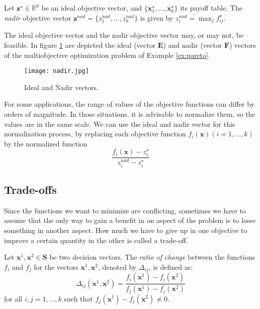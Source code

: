 {\begin{definition}
Let $\mathbf{z}^\star \in \mathbb{R}^k$ be an ideal objective vector, and $\{ \mathbf{x}^\star_1, \ldots, \mathbf{x}^\star_k \}$ its payoff table. The \emph{nadir} objective vector $\mathbf{z}^{nad} = \{ z^{nad}_1, \ldots, z^{nad}_k \}$ is given by $z^{nad}_i = \max_j f^\star_{ij}$.
\end{definition}

The ideal objective vector and the nadir objective vector may, or may not, be feasible. In figure \ref{fig:nadir} are depicted the ideal (vector $\mathbf{E}$) and nadir (vector $\mathbf{F}$) vectors of the multiobjective optimization problem of Example \ref{ex:pareto}.

\begin{figure}[h]
\centering\texttt{[image: nadir.jpg]}
\caption{\label{fig:nadir}Ideal and Nadir vectors.}
\end{figure}

For some applications, the range of values of the objective functions can differ by orders of magnitude. In those situations, it is advisable to normalize them, so the values are in the same scale. We can use the ideal and nadir vector for this normalization process, by replacing each objective function $f_i (\mathbf{x}) (i = 1, \ldots, k)$ by the normalized function
\[
\frac{f_i(\mathbf{x}) - z^\star_i}{z^{nad}_i - z^\star_i}
\]


\subsection{Trade-offs}

Since the functions we want to minimize are conflicting, sometimes we have to assume that the only way to gain a benefit in on aspect of the problem is to losse something in another aspect. How much we have to give up in one objective to improve a certain quantity in the other is called a trade-off.

\begin{definition}
Let $\mathbf{x}^1, \mathbf{x}^2 \in \mathbf{S}$ be two decision vectors. The \emph{ratio of change} between the functions $f_i$ and $f_j$ for the vectors $\mathbf{x}^1, \mathbf{x}^2$, denoted by $\Delta_{ij}$, is defined as:
\[
\Delta_{ij} ( \mathbf{x}^1, \mathbf{x}^2 ) = \frac{f_i(\mathbf{x}^1) - f_i(\mathbf{x}^2)}{f_j(\mathbf{x}^1) - f_j(\mathbf{x}^2)}
\] 
for all $i, j = 1, \ldots, k$ such that $f_j(\mathbf{x}^1) - f_j(\mathbf{x}^2) \neq 0$.
\end{definition}

}
